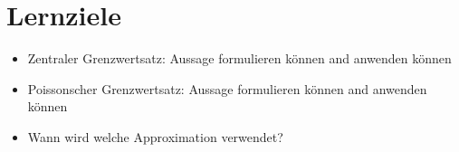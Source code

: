 


\section*{Lernziele}
\begin{itemize}
    \item Zentraler Grenzwertsatz:
    Aussage formulieren können and anwenden können
    \item Poissonscher Grenzwertsatz:
    Aussage formulieren können and anwenden können
    \item Wann wird welche Approximation verwendet?
\end{itemize}


